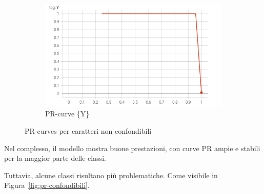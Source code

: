 \begin{figure}[htbp]
\begin{subfigure}[t]{0.32\textwidth}
        \includegraphics[width=\textwidth]{images/pr_curve3.png}
        \caption{PR-curve \{Y\}}
    \end{subfigure}
    \caption{PR-curves per caratteri non confondibili}
    \label{fig:pr_curves}
\end{figure}

Nel complesso, il modello mostra buone prestazioni, con curve PR ampie e stabili per la maggior parte delle classi.

Tuttavia, alcune classi risultano più problematiche. Come visibile in Figura~\ref{fig:pr-confondibili}.

